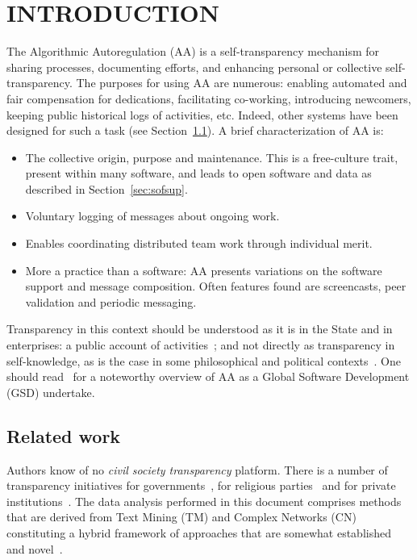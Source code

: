 \documentclass[12pt,fleqn]{article}
\begin{document}
\section{INTRODUCTION}\label{sec:intro}\label{sec:start}
The Algorithmic Autoregulation (AA) is a self-transparency mechanism for sharing processes,
documenting efforts, and enhancing personal or collective self-transparency.
The purposes for using AA are numerous:
enabling automated and fair compensation for dedications,
facilitating co-working, introducing newcomers,
keeping public historical logs of activities, etc.
Indeed, other systems have been designed for such a task (see Section~\ref{sec:rel}).
A brief characterization of AA is:
\begin{itemize}
    \item The collective origin, purpose and maintenance.
	    This is a free-culture trait, present within many software,
		and leads to open software and data as described in Section~\ref{sec:sofsup}.
    \item Voluntary logging of messages about ongoing work.
    \item Enables coordinating distributed team work through individual merit.
    \item More a practice than a software: AA presents variations on the software support and message composition.
	    Often features found are screencasts, peer validation and periodic messaging.
\end{itemize}

Transparency in this context should be understood as it is
in the State and in enterprises:
a public account of activities~\citep{stso};
and not directly as transparency in self-knowledge,
as is the case in some philosophical and political contexts~\citep{stph}.
One should read~\cite{paaper} for a noteworthy overview of AA as a Global Software Development (GSD) undertake.

\subsection{Related work}\label{sec:rel}
Authors know of no \emph{civil society transparency} platform.
There is a number of transparency initiatives for governments~\citep{govTr},
for religious parties~\citep{espTr} and for private institutions~\citep{priTr}.
The data analysis performed in this document
comprises methods that are derived from Text Mining (TM)
and Complex Networks (CN) constituting a hybrid framework of
approaches that are somewhat established~\citep{cla1} and novel~\citep{nov1,nov2}.
\end{document}
